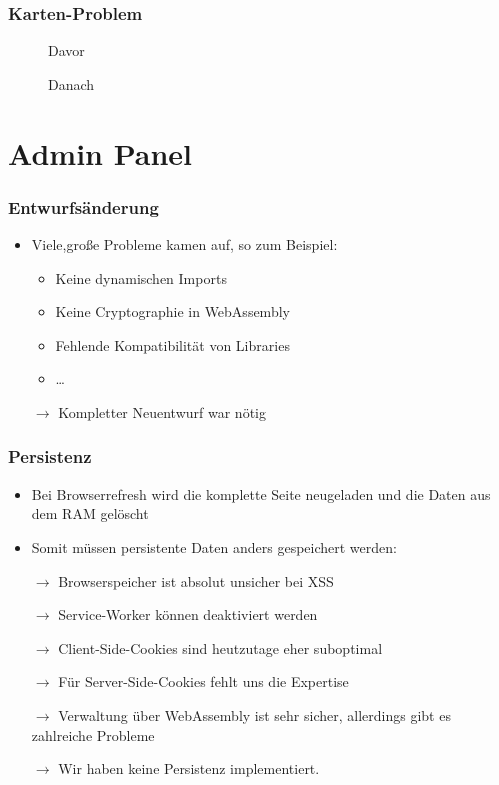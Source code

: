 \begin{frame}\frametitle{Karten-Problem}
    \begin{minipage}{.49\textwidth}
        \centering
        \begin{figure}
            \caption{Davor}
        \end{figure}
    \end{minipage}
    \begin{minipage}{.49\textwidth}
        \centering
        \begin{figure}
            \caption{Danach}
        \end{figure}
    \end{minipage}
\end{frame}

\section{Admin Panel}

\begin{frame}\frametitle{Entwurfsänderung}
    \begin{itemize}
        \item Viele,große Probleme kamen auf, so zum Beispiel: \begin{itemize}
            \item Keine dynamischen Imports
            \item Keine Cryptographie in WebAssembly
            \item Fehlende Kompatibilität von Libraries
            \item \dots
        \end{itemize}
        \item[$\rightarrow$] Kompletter Neuentwurf war nötig
    \end{itemize}
\end{frame}

\begin{frame}\frametitle{Persistenz}
    \begin{itemize}
        \item Bei Browserrefresh wird die komplette Seite neugeladen und die Daten aus dem RAM gelöscht
        \item Somit müssen persistente Daten anders gespeichert werden:
        \item[$\rightarrow$] Browserspeicher ist absolut unsicher bei XSS
        \item[$\rightarrow$] Service-Worker können deaktiviert werden
        \item[$\rightarrow$] Client-Side-Cookies sind heutzutage eher suboptimal  
        \item[$\rightarrow$] Für Server-Side-Cookies fehlt uns die Expertise
        \item[$\rightarrow$] Verwaltung über WebAssembly ist sehr sicher, allerdings gibt es zahlreiche Probleme
        \item[$\rightarrow$] Wir haben keine Persistenz implementiert.   
    \end{itemize}
\end{frame}